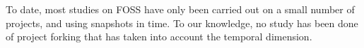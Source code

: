 \documentclass[ifip]{svmult}
\begin{document}
To date, most studies on FOSS have only been carried out on a small number of projects, and using snapshots in time. To our knowledge, no study has been done of project forking that has taken into account the temporal dimension.

%
%
\end{document}
